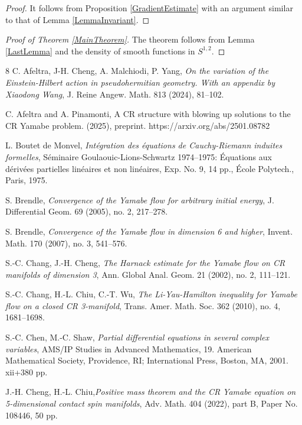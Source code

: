 \documentclass[a4paper,12pt]{amsart}
\begin{document}
\begin{proof}
 It follows from Proposition \ref{GradientEstimate} with an argument  similar to that of Lemma \ref{LemmaInvariant}.
\end{proof}

\begin{proof}[Proof of Theorem \ref{MainTheorem}]
 The theorem follows from Lemma \ref{LastLemma} and the density of smooth functions in $S^{1,2}$.
\end{proof}

\begin{thebibliography}{8}
 C. Afeltra, J-H. Cheng, A. Malchiodi, P. Yang,
 \textit{On the variation of the Einstein-Hilbert action in pseudohermitian geometry. With an appendix by Xiaodong Wang},  J. Reine Angew. Math. 813 (2024), 81–102.

C. Afeltra and A. Pinamonti, 
A CR structure with blowing up solutions to the CR Yamabe problem. 
(2025), preprint. https://arxiv.org/abs/2501.08782

 L. Boutet de Monvel,
 \textit{Intégration des équations de Cauchy-Riemann induites formelles},
 Séminaire Goulaouic-Lions-Schwartz 1974–1975: Équations aux dérivées partielles linéaires et non linéaires, Exp. No. 9, 14 pp., École Polytech., Paris, 1975. 

 S. Brendle,
 \textit{Convergence of the Yamabe flow for arbitrary initial energy},
J. Differential Geom. 69 (2005), no. 2, 217–278.

 S. Brendle,
 \textit{Convergence of the Yamabe flow in dimension 6 and higher},
Invent. Math. 170 (2007), no. 3, 541–576.

S.-C. Chang, J.-H. Cheng,
\textit{The Harnack estimate for the Yamabe flow on CR manifolds of dimension 3},
Ann. Global Anal. Geom. 21 (2002), no. 2, 111–121. 

 S.-C. Chang, H.-L. Chiu, C.-T. Wu,
\textit{The Li-Yau-Hamilton inequality for Yamabe flow on a closed CR 3-manifold},
Trans. Amer. Math. Soc. 362 (2010), no. 4, 1681–1698. 

 S.-C. Chen, M.-C. Shaw,
 \textit{Partial differential equations in several complex variables},
AMS/IP Studies in Advanced Mathematics, 19. American Mathematical Society, Providence, RI; International Press, Boston, MA, 2001. xii+380 pp.

   J.-H. Cheng, H.-L. Chiu,\textit{Positive mass theorem and the CR Yamabe equation on 5-dimensional contact spin manifolds}, Adv. Math. 404 (2022), part B, Paper No. 108446, 50 pp.


\end{thebibliography}
\end{document}

